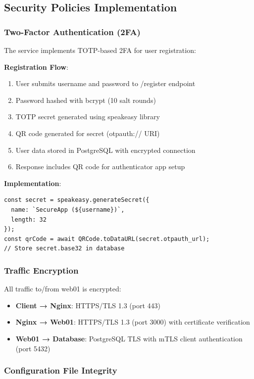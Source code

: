 \subsection{Security Policies Implementation}

\subsubsection{Two-Factor Authentication (2FA)}

The service implements TOTP-based 2FA for user registration:

\textbf{Registration Flow}:
\begin{enumerate}
    \item User submits username and password to /register endpoint
    \item Password hashed with bcrypt (10 salt rounds)
    \item TOTP secret generated using speakeasy library
    \item QR code generated for secret (otpauth:// URI)
    \item User data stored in PostgreSQL with encrypted connection
    \item Response includes QR code for authenticator app setup
\end{enumerate}

\textbf{Implementation}:
\begin{verbatim}
const secret = speakeasy.generateSecret({
  name: `SecureApp (${username})`,
  length: 32
});
const qrCode = await QRCode.toDataURL(secret.otpauth_url);
// Store secret.base32 in database
\end{verbatim}

\subsubsection{Traffic Encryption}

All traffic to/from web01 is encrypted:
\begin{itemize}
    \item \textbf{Client → Nginx}: HTTPS/TLS 1.3 (port 443)
    \item \textbf{Nginx → Web01}: HTTPS/TLS 1.3 (port 3000) with certificate verification
    \item \textbf{Web01 → Database}: PostgreSQL TLS with mTLS client authentication (port 5432)
\end{itemize}

\subsubsection{Configuration File Integrity}

